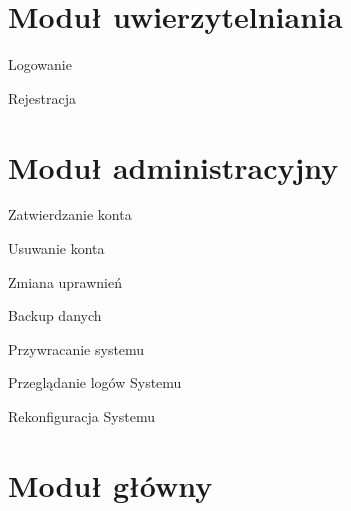 \section{Moduł uwierzytelniania}

\begin{sequence}{Logowanie}
\end{sequence}

\begin{sequence}{Rejestracja}
\end{sequence}

\section{Moduł administracyjny}

\begin{sequence}{Zatwierdzanie konta}
\end{sequence}

\begin{sequence}{Usuwanie konta}
\end{sequence}

\begin{sequence}{Zmiana uprawnień}
\end{sequence}

\begin{sequence}{Backup danych}
\end{sequence}

\begin{sequence}{Przywracanie systemu}
\end{sequence}

\begin{sequence}{Przeglądanie logów Systemu}
\end{sequence}

\begin{sequence}{Rekonfiguracja Systemu}
\end{sequence}

\section{Moduł główny}

